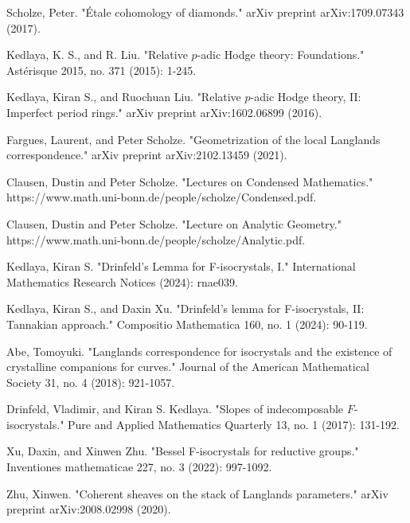 \documentclass[12pt]{book}
\theoremstyle{definition}
\begin{document}
\begin{thebibliography}{}
 Scholze, Peter. "\'Etale cohomology of diamonds." arXiv preprint arXiv:1709.07343 (2017).

 Kedlaya, K. S., and R. Liu. "Relative $p$-adic Hodge theory: Foundations." Ast\'erisque 2015, no. 371 (2015): 1-245.

 Kedlaya, Kiran S., and Ruochuan Liu. "Relative $p$-adic Hodge theory, II: Imperfect period rings." arXiv preprint arXiv:1602.06899 (2016).

 Fargues, Laurent, and Peter Scholze. "Geometrization of the local Langlands correspondence." arXiv preprint arXiv:2102.13459 (2021).

 Clausen, Dustin and Peter Scholze. "Lectures on Condensed Mathematics." https://www.math.uni-bonn.de/people/scholze/Condensed.pdf.

 Clausen, Dustin and Peter Scholze. "Lecture on Analytic Geometry." https://www.math.uni-bonn.de/people/scholze/Analytic.pdf.

 Kedlaya, Kiran S. "Drinfeld's Lemma for F-isocrystals, I." International Mathematics Research Notices (2024): rnae039.

 Kedlaya, Kiran S., and Daxin Xu. "Drinfeld's lemma for F-isocrystals, II: Tannakian approach." Compositio Mathematica 160, no. 1 (2024): 90-119.

 Abe, Tomoyuki. "Langlands correspondence for isocrystals and the existence of crystalline companions for curves." Journal of the American Mathematical Society 31, no. 4 (2018): 921-1057.

 Drinfeld, Vladimir, and Kiran S. Kedlaya. "Slopes of indecomposable $ F $-isocrystals." Pure and Applied Mathematics Quarterly 13, no. 1 (2017): 131-192.

 Xu, Daxin, and Xinwen Zhu. "Bessel F-isocrystals for reductive groups." Inventiones mathematicae 227, no. 3 (2022): 997-1092.

 Zhu, Xinwen. "Coherent sheaves on the stack of Langlands parameters." arXiv preprint arXiv:2008.02998 (2020).







\end{thebibliography}
\end{document}
